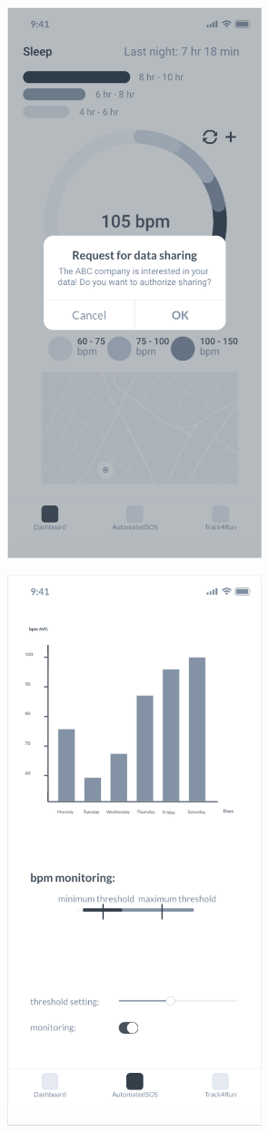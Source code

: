 \documentclass{article}
\begin{document}
	\begin{figure}[!h]
	 	\centering
		\includegraphics[height=16cm,keepaspectratio]{Figures/4DataSharing}
	\end{figure}\newpage
	
	\begin{figure}[!h]
	 	\centering
		\includegraphics[height=16cm,keepaspectratio]{Figures/5AutomatedSOS}
	\end{figure}\newpage
	
\end{document}
